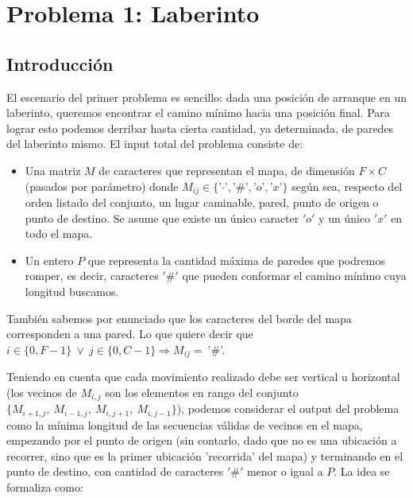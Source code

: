 \section{Problema 1: Laberinto}
\subsection{Introducción}

El escenario del primer problema es sencillo: dada una posición de arranque en un laberinto, queremos encontrar el camino mínimo hacia una posición final. Para lograr esto podemos derribar hasta cierta cantidad, ya determinada, de paredes del laberinto mismo. El input total del problema consiste de:

    \begin{itemize}
        \item Una matriz $M$ de caracteres que representan el mapa, de dimensión $F\times C$ (pasados por parámetro) donde $M_{ij} \in \{$'$\cdotp$'$,$'$\#$'$,$'$o$'$,$'$x$'$\}$ según sea, respecto del orden listado del conjunto, un lugar caminable, pared, punto de origen o punto de destino. Se asume que existe un único caracter $'o'$ y un único $'x'$ en todo el mapa.
        \item Un entero $P$ que representa la cantidad máxima de paredes que podremos romper, es decir, caracteres $'\#'$ que pueden conformar el camino mínimo cuya longitud buscamos.
    \end{itemize}

También sabemos por enunciado que los caracteres del borde del mapa corresponden a una pared. Lo que quiere decir que $i \in \{0, F-1\} \ \vee \ j \in \{0, C-1\} \Rightarrow M_{ij} =\ $'$\#$'.

Teniendo en cuenta que cada movimiento realizado debe ser vertical u horizontal (los vecinos de $M_{i,j}$ son los elementos en rango del conjunto $\{M_{i+1,j},\ M_{i-1,j},\ M_{i,j+1},\ M_{i,j-1}\}$), podemos considerar el output del problema como la mínima longitud de las secuencias válidas de vecinos en el mapa, empezando por el punto de origen (sin contarlo, dado que no es una ubicación a recorrer, sino que es la primer ubicación 'recorrida' del mapa) y terminando en el punto de destino, con cantidad de caracteres $'\#'$ menor o igual a $P$. La idea se formaliza como:
\\

